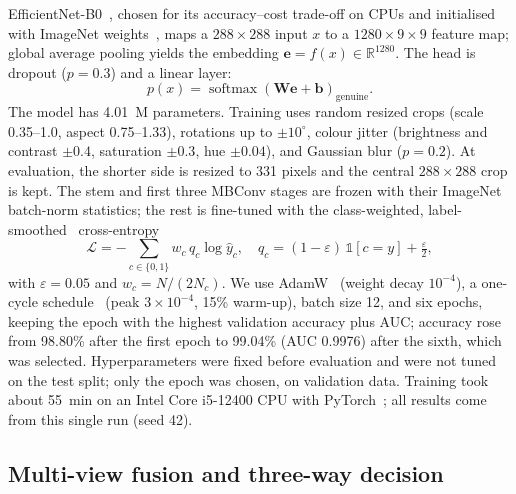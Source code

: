 \documentclass[pdflatex,sn-mathphys-num]{sn-jnl}
\begin{document}
EfficientNet-B0~\cite{tan2019efficientnet}, chosen for its accuracy--cost trade-off on
CPUs and initialised with ImageNet weights~\cite{deng2009imagenet}, maps a
$288\times288$ input $x$ to a $1280\times9\times9$ feature map; global average pooling
yields the embedding $\mathbf{e}=f(x)\in\mathbb{R}^{1280}$. The head is dropout
($p=0.3$) and a linear layer:
\begin{equation}
p(x) = \operatorname{softmax}\!\left(\mathbf{W}\mathbf{e}+\mathbf{b}\right)_{\text{genuine}} .
\label{eq:prob}
\end{equation}
The model has 4.01~M parameters. Training uses random resized crops (scale 0.35--1.0,
aspect 0.75--1.33), rotations up to $\pm10^\circ$, colour jitter (brightness and contrast
$\pm0.4$, saturation $\pm0.3$, hue $\pm0.04$), and Gaussian blur ($p=0.2$). At
evaluation, the shorter side is resized to 331 pixels and the central $288\times288$
crop is kept. The stem and first three MBConv stages are frozen with their ImageNet
batch-norm statistics; the rest is fine-tuned with the class-weighted,
label-smoothed~\cite{szegedy2016inception} cross-entropy
\begin{equation}
\mathcal{L} = -\sum_{c\in\{0,1\}} w_c\, q_c \log \hat{y}_c, \quad
q_c = (1-\varepsilon)\,\mathbb{1}[c=y] + \tfrac{\varepsilon}{2},
\label{eq:loss}
\end{equation}
with $\varepsilon=0.05$ and $w_c=N/(2N_c)$. We use AdamW~\cite{loshchilov2019adamw}
(weight decay $10^{-4}$), a one-cycle schedule~\cite{smith2019superconvergence} (peak
$3\times10^{-4}$, 15\% warm-up), batch size 12, and six epochs, keeping the epoch with
the highest validation accuracy plus AUC; accuracy rose from 98.80\% after the first
epoch to 99.04\% (AUC 0.9976) after the sixth, which was selected. Hyperparameters were
fixed before evaluation and were not tuned on the test split; only the epoch was chosen,
on validation data. Training took about 55~min on an Intel Core i5-12400 CPU with
PyTorch~\cite{paszke2019pytorch}; all results come from this single run (seed 42).

\subsection{Multi-view fusion and three-way decision}\label{sec:decision}
\end{document}
